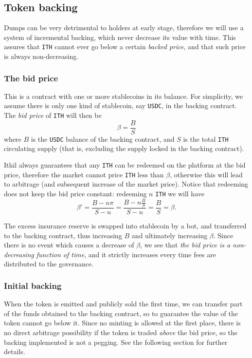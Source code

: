 \documentclass[a4paper,10 pt]{article}
\theoremstyle{definition}
\begin{document}
\subsection{Token backing}\label{backing}

Dumps can be very detrimental to holders at early stage, therefore we will use a system of incremental backing, which never decrease its value with time. This assures that \verb|ITH| cannot ever go below a certain {\it backed price}, and that such price is always non-decreasing.

\subsubsection{The bid price}

This is a contract with one or more stablecoins in its balance. For simplicity, we assume there is only one kind of stablecoin, say \verb|USDC|, in the backing contract. The {\it bid price} of \verb|ITH| will then be
\begin{equation}\label{bid price}
\beta = \frac{B}{S}
\end{equation} 
where $B$ is the \verb|USDC| balance of the backing contract, and $S$ is the total \verb|ITH| circulating supply (that is, excluding the supply locked in the backing contract).

Ithil always guarantees that any \verb|ITH| can be redeemed on the platform at the bid price, therefore the market cannot price \verb|ITH| less than $\beta$, otherwise this will lead to arbitrage (and subsequent increase of the market price). Notice that redeeming does not keep the bid price constant: redeeming $n$ \verb|ITH| we will have
$$\beta' = \frac{B - n\pi}{S - n} = \frac{B - n\frac{B}{S}}{S-n} = \frac{B}{S} = \beta.$$

The excess insurance reserve is swapped into stablecoin by a bot, and transferred to the backing contract, thus increasing $B$ and ultimately increasing $\beta$. Since there is no event which causes a decrease of $\beta$, we see that {\it the bid price is a non-decreasing function of time}, and it strictly increases every time fees are distributed to the governance.

\subsubsection{Initial backing}

When the token is emitted and publicly sold the first time, we can transfer part of the funds obtained to the backing contract, so to guarantee the value of the token cannot go below it. Since no minting is allowed at the first place, there is no direct arbitrage possibility if the token is traded {\it above} the bid price, so the backing implemented is not a pegging. See the following section for further details.
\end{document}
